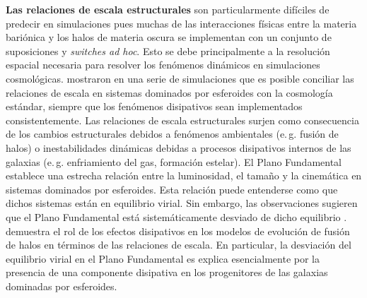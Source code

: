 \documentclass{article}
\begin{document}
\begin{description}
\textbf{Las relaciones de escala estructurales} son particularmente difíciles de predecir en
simulaciones pues muchas de las interacciones físicas entre la materia bariónica y los halos de
materia oscura se implementan con un conjunto de suposiciones y \emph{switches ad hoc}. Esto se debe
principalmente a la resolución espacial necesaria para resolver los fenómenos dinámicos en
simulaciones cosmológicas. \citeauthor{Hopkins2009} mostraron en una serie de simulaciones que es
posible conciliar las relaciones de escala en sistemas dominados por esferoides con la cosmología
estándar, siempre que los fenómenos disipativos sean implementados consistentemente. Las relaciones
de escala estructurales surjen como consecuencia de los cambios estructurales debidos a fenómenos
ambientales (e.\,g. fusión de halos) o inestabilidades dinámicas debidas a procesos disipativos
internos de las galaxias (e.\,g. enfriamiento del gas, formación estelar). El Plano Fundamental
establece una estrecha relación entre la luminosidad, el tamaño y la cinemática en sistemas
dominados por esferoides. Esta relación puede entenderse como que dichos sistemas están en
equilibrio virial. Sin embargo, las observaciones sugieren que el Plano Fundamental está
sistemáticamente desviado de dicho equilibrio \citep[véase discusión en][]{Cappellari2016}.
\citep{Hopkins2009} demuestra el rol de los efectos disipativos en los modelos de evolución de
fusión de halos en términos de las relaciones de escala. En particular, la desviación del equilibrio
virial en el Plano Fundamental es explica esencialmente por la presencia de una componente
disipativa en los progenitores de las galaxias dominadas por esferoides.
%
\end{description}
\end{document}
